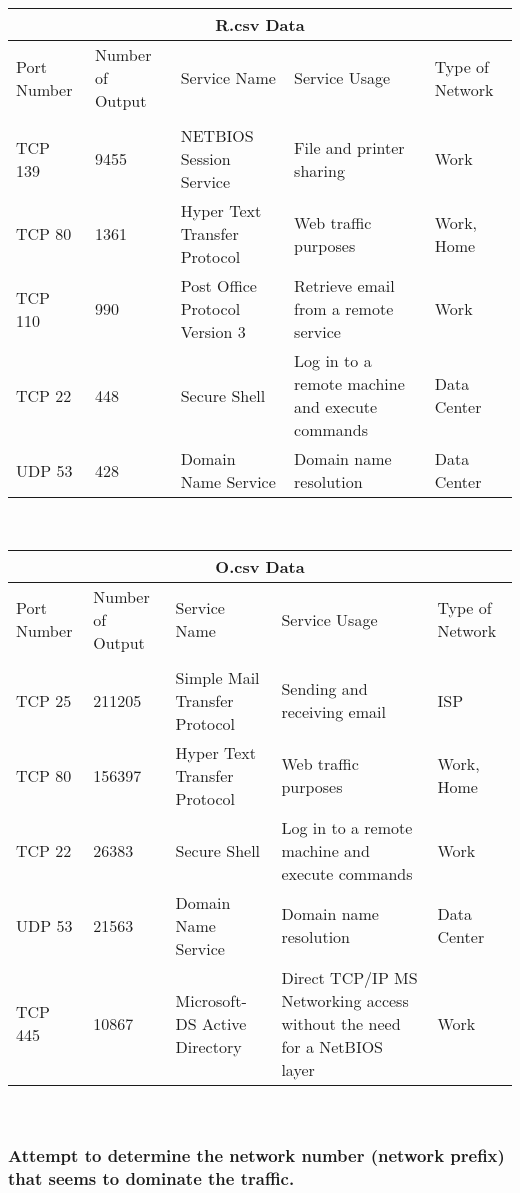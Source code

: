 \documentclass[letterpaper,10pt,titlepage,draftclsnofoot,onecolumn]{IEEEtran}
\begin{document}
\begin{tabular}{ |p{3cm}||p{3cm}|p{3cm}|p{3cm}|p{3cm}| }
 \hline
 \multicolumn{5}{|c|}{R.csv Data} \\
 \hline
 Port Number & Number of Output & Service Name & Service Usage & Type of Network\\
 \hline 
 &&&&\\
TCP 139 & 9455 & NETBIOS Session Service & File and printer sharing & Work\\
TCP 80  & 1361 & Hyper Text Transfer Protocol & Web traffic purposes & Work, Home\\
TCP 110 & 990  & Post Office Protocol Version 3 & Retrieve email from a remote service & Work \\
TCP 22  & 448  & Secure Shell & Log in to a remote machine and execute commands & Data Center\\
UDP 53  & 428  & Domain Name Service & Domain name resolution & Data Center\\
 \hline
\end{tabular}

\hfill\\

\begin{tabular}{ |p{3cm}||p{3cm}|p{3cm}|p{3cm}|p{3cm}|  }
 \hline
 \multicolumn{5}{|c|}{O.csv Data} \\
 \hline
 Port Number & Number of Output & Service Name & Service Usage & Type of Network\\
 \hline 
 &&&&\\
TCP 25 & 211205 & Simple Mail Transfer Protocol & Sending and receiving email & ISP \\
TCP 80  & 156397 & Hyper Text Transfer Protocol & Web traffic purposes & Work, Home \\
TCP 22  & 26383  & Secure Shell & Log in to a remote machine and execute commands & Work\\
UDP 53  & 21563  & Domain Name Service & Domain name resolution & Data Center \\
TCP 445  & 10867  & Microsoft-DS Active Directory & Direct TCP/IP MS Networking access without the need for a NetBIOS layer & Work\\
 \hline
\end{tabular}
\hfill\\
\subsubsection{Attempt to determine the network number (network prefix) that seems to dominate the traffic.}
\hfill\\
\end{document}
